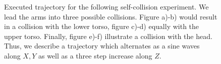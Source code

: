 \begin{figure}[h!]
  \centering
  	\caption{Executed trajectory for the following self-collision experiment. We lead the arms into three possible collisions. Figure a)-b) would result in a collision with the lower torso, figure c)-d) equally with the upper torso. Finally, figure e)-f) illustrate a collision with the head. Thus, we describe a trajectory which alternates as a sine waves along $X,Y$ as well as a three step increase along $Z$.}
	\label{fig:armbody}
\end{figure}
